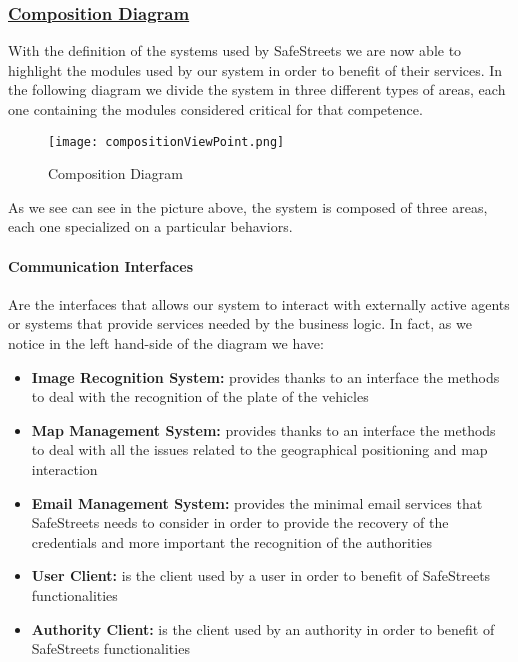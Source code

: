 		\subsubsection[Composition Diagram]{\hyperlink{toc}{Composition Diagram}}
			\label{sec:compositionDiagram}
			
			With the definition of the systems used by SafeStreets we are now able to highlight the modules used by our system in order to benefit of their services. In the following diagram we divide the system in three different types of areas, each one containing the modules considered critical for that competence.
			
			\newpage
			
			\begin{figure}[ht]
				\centering
				\texttt{[image: compositionViewPoint.png]}
				\caption{\label{fig:compositionDiagram} Composition Diagram}
			\end{figure}
		
			As we see can see in the picture above, the system is composed of three areas, each one specialized on a particular behaviors.
			
			\paragraph{Communication Interfaces} Are the interfaces that allows our system to interact with externally active agents or systems that provide services needed by the business logic. In fact, as we notice in the left hand-side of the diagram we have:
			
			\begin{itemize}
				\item \textbf{Image Recognition System:} provides thanks to an interface the methods to deal with the recognition of the plate of the vehicles
				\item \textbf{Map Management System:} provides thanks to an interface the methods to deal with all the issues related to the geographical positioning and map interaction
				\item \textbf{Email Management System:} provides the minimal email services that SafeStreets needs to consider in order to provide the recovery of the credentials and more important the recognition of the authorities
				\item \textbf{User Client:} is the client used by a user in order to benefit of SafeStreets functionalities
				\item \textbf{Authority Client:} is the client used by an authority in order to benefit of SafeStreets functionalities
			\end{itemize}
		
